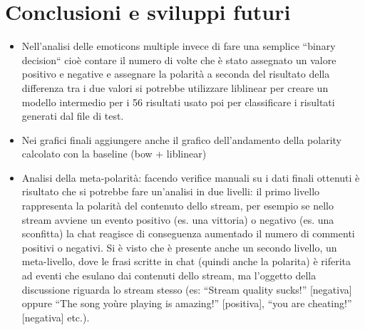 \documentclass[a4paper,12pt,openright,twoside]{report}
\theoremstyle{definition}
\begin{document}
\chapter{Conclusioni e sviluppi futuri}
\label{ch:sviluppi}
\begin{itemize}
\item Nell'analisi delle emoticons multiple invece di fare una semplice ``binary decision`` cioè contare il numero di volte che è stato assegnato un valore positivo e negative e assegnare la polarità a seconda del risultato della differenza tra i due valori si potrebbe utilizzare liblinear per creare un modello intermedio per i 56 risultati usato poi per classificare i risultati generati dal file di test.
\item Nei grafici finali aggiungere anche il grafico dell'andamento della polarity calcolato con la baseline (bow + liblinear)
\item Analisi della meta-polarità: facendo verifice manuali su i dati finali ottenuti è risultato che si potrebbe fare un'analisi in due livelli: il primo livello rappresenta la polarità del contenuto dello stream, per esempio se nello stream avviene un evento positivo (es. una vittoria) o negativo (es. una sconfitta) la chat reagisce di conseguenza aumentado il numero di commenti positivi o negativi.
Si è visto che è presente anche un secondo livello, un meta-livello, dove le frasi scritte in chat (quindi anche la polarita) è riferita ad eventi che esulano dai contenuti dello stream, ma l'oggetto della discussione riguarda lo stream stesso (es: ``Stream quality sucks!'' [negativa] oppure ``The song yoùre playing is amazing!'' [positiva], ``you are cheating!'' [negativa] etc.).
\end{itemize}



\end{document}
